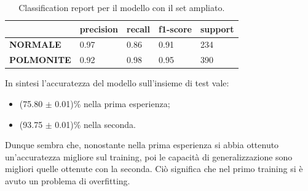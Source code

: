   

\begin{table}[H]
  \begin{tabular}{@{}l|llll@{}}
  \toprule
                     & \textbf{precision} & \textbf{recall} & \textbf{f1-score} & \textbf{support} \\ \midrule
  \textbf{NORMALE}   & 0.97               & 0.86            & 0.91              & 234              \\
  \textbf{POLMONITE} & 0.92               & 0.98            & 0.95              & 390              \\ \midrule
  \end{tabular}
  \caption{Classification report per il modello con il set ampliato.}
\end{table}

In sintesi l'accuratezza del modello sull'insieme di test vale:
\begin{itemize}
  \item  (75.80 $\pm$ 0.01)\% nella prima esperienza;
  \item  (93.75 $\pm$ 0.01)\% nella seconda.
\end{itemize}
Dunque sembra che, nonostante nella prima esperienza si abbia ottenuto un'accuratezza migliore sul training, 
poi le capacità di generalizzazione sono migliori quelle ottenute con la seconda.
 Ciò significa che nel primo training si è avuto un problema di overfitting. 


